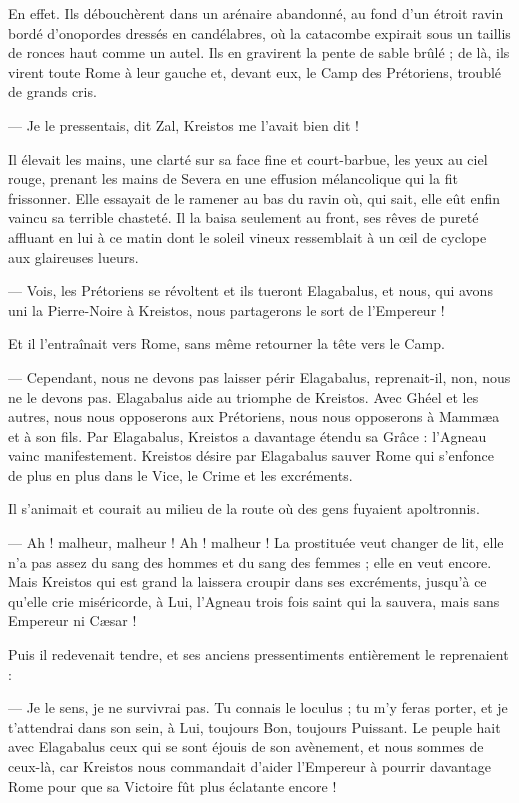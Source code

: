 \documentclass[a4paper, 11pt, oneside, polutonikogreek, french]{article}
\begin{document}
En effet. Ils débouchèrent dans un arénaire abandonné, au fond d'un étroit ravin bordé d'onopordes dressés en candélabres, où la catacombe expirait sous un taillis de ronces haut comme un autel. Ils en gravirent la pente de sable brûlé ; de là, ils virent toute Rome à leur gauche et, devant eux, le Camp des Prétoriens, troublé de grands cris.

--- Je le pressentais, dit Zal, Kreistos me l'avait bien dit !

Il élevait les mains, une clarté sur sa face fine et court-barbue, les yeux au ciel rouge, prenant les mains de Severa en une effusion mélancolique qui la fit frissonner. Elle essayait de le ramener au bas du ravin où, qui sait, elle eût enfin vaincu sa terrible chasteté. Il la baisa seulement au front, ses rêves de pureté affluant en lui à ce matin dont le soleil vineux ressemblait à un œil de cyclope aux glaireuses lueurs.

--- Vois, les Prétoriens se révoltent et ils tueront Elagabalus, et nous, qui avons uni la Pierre-Noire à Kreistos, nous partagerons le sort de l'Empereur !

Et il l'entraînait vers Rome, sans même retourner la tête vers le Camp.

--- Cependant, nous ne devons pas laisser périr Elagabalus, reprenait-il, non, nous ne le devons pas. Elagabalus aide au triomphe de Kreistos. Avec Ghéel et les autres, nous nous opposerons aux Prétoriens, nous nous opposerons à Mammæa et à son fils. Par Elagabalus, Kreistos a davantage étendu sa Grâce : l'Agneau vainc manifestement. Kreistos désire par Elagabalus sauver Rome qui s'enfonce de plus en plus dans le Vice, le Crime et les excréments.

Il s'animait et courait au milieu de la route où des gens fuyaient apoltronnis.

--- Ah ! malheur, malheur ! Ah ! malheur ! La prostituée veut changer de lit, elle n'a pas assez du sang des hommes et du sang des femmes ; elle en veut encore. Mais Kreistos qui est grand la laissera croupir dans ses excréments, jusqu'à ce qu'elle crie miséricorde, à Lui, l'Agneau trois fois saint qui la sauvera, mais sans Empereur ni Cæsar !

Puis il redevenait tendre, et ses anciens pressentiments entièrement le reprenaient :

--- Je le sens, je ne survivrai pas. Tu connais le loculus ; tu m'y feras porter, et je t'attendrai dans son sein, à Lui, toujours Bon, toujours Puissant. Le peuple hait avec Elagabalus ceux qui se sont éjouis de son avènement, et nous sommes de ceux-là, car Kreistos nous commandait d'aider l'Empereur à pourrir davantage Rome pour que sa Victoire fût plus éclatante encore !
\end{document}
